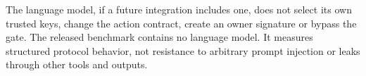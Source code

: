 The language model, if a future integration includes one, does not select its own
trusted keys, change the action contract, create an owner signature or bypass the
gate. The released benchmark contains no language model. It measures structured
protocol behavior, not resistance to arbitrary prompt injection or leaks through
other tools and outputs.


